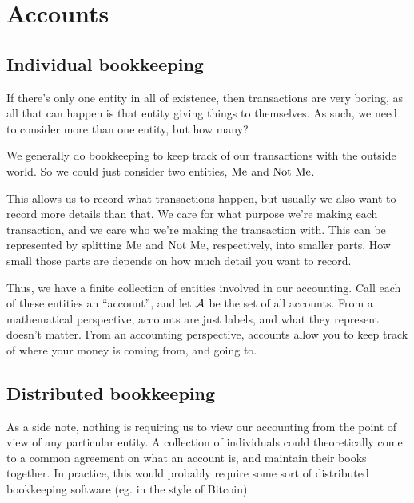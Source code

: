 \section{Accounts}

\subsection{Individual bookkeeping}

If there's only one entity in all of existence, then transactions are very boring, as all that can happen is that entity giving things to themselves.
As such, we need to consider more than one entity, but how many?

We generally do bookkeeping to keep track of our transactions with the outside world.
So we could just consider two entities, $\operatorname{Me}$ and $\operatorname{Not~Me}$.

This allows us to record what transactions happen, but usually we also want to record more details than that.
We care for what purpose we're making each transaction, and we care who we're making the transaction with.
This can be represented by splitting $\operatorname{Me}$ and $\operatorname{Not~Me}$, respectively, into smaller parts.
How small those parts are depends on how much detail you want to record.

Thus, we have a finite collection of entities involved in our accounting.
Call each of these entities an ``account'', and let $\mathcal{A}$ be the set of all accounts.
From a mathematical perspective, accounts are just labels, and what they represent doesn't matter.
From an accounting perspective, accounts allow you to keep track of where your money is coming from, and going to.

\subsection{Distributed bookkeeping}

As a side note, nothing is requiring us to view our accounting from the point of view of any particular entity.
A collection of individuals could theoretically come to a common agreement on what an account is, and maintain their books together.
In practice, this would probably require some sort of distributed bookkeeping software
(eg. in the style of Bitcoin).
